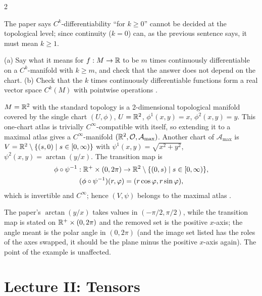 \begin{paracol}{2}
\begin{coursenote}
The paper says $C^k$-differentiability ``for $k\geq0$'' cannot be decided at the topological level; since continuity ($k=0$) can, as the previous sentence says, it must mean $k\geq1$.
\end{coursenote}

\begin{exercise}\label{ex:c29-fun}
(a) Say what it means for $f:M\to\mathbb{R}$ to be $m$ times continuously differentiable on a $C^{k}$-manifold with $k\ge m$, and check that the answer does not depend on the chart. (b) Check that the $k$ times continuously differentiable functions form a real vector space $C^k(M)$ with pointwise operations .
\end{exercise}

\begin{example}\label{ex:c29-plane}
$M=\mathbb{R}^2$ with the standard topology is a 2-dimensional topological manifold covered by the single chart $(U,\phi)$, $U=\mathbb{R}^2$, $\phi^1(x,y)=x$, $\phi^2(x,y)=y$. This one-chart atlas is trivially $C^\infty$-compatible with itself, so extending it to a maximal atlas gives a $C^\infty$-manifold $(\mathbb{R}^2,\mathcal O,\mathcal A_{\max})$. Another chart of $\mathcal A_{\max}$ is $V=\mathbb{R}^2\setminus\{(s,0)\mid s\in[0,\infty)\}$ with $\psi^1(x,y)=\sqrt{x^2+y^2}$, $\psi^2(x,y)=\arctan(y/x)$. The transition map is
\begin{gather*}
  \phi\circ\psi^{-1}:\mathbb{R}^+\times(0,2\pi)\to\mathbb{R}^2\setminus\{(0,s)\mid s\in[0,\infty)\},\\
  (\phi\circ\psi^{-1})(r,\varphi)=(r\cos\varphi,r\sin\varphi),
\end{gather*}
which is invertible and $C^\infty$; hence $(V,\psi)$ belongs to the maximal atlas .
\end{example}
\begin{coursenote}
The paper's $\arctan(y/x)$ takes values in $(-\pi/2,\pi/2)$, while the transition map is stated on $\mathbb{R}^+\times(0,2\pi)$ and the removed set is the positive $x$-axis; the angle meant is the polar angle in $(0,2\pi)$ (and the image set listed has the roles of the axes swapped, it should be the plane minus the positive $x$-axis again). The point of the example is unaffected.
\end{coursenote}

\section{Lecture II: Tensors}\label{sec:c29-L2}


\end{paracol}
